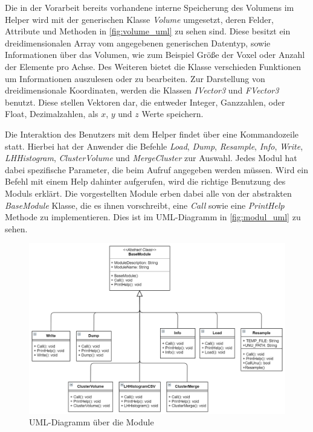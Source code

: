 Die in der Vorarbeit bereits vorhandene interne Speicherung des Volumens im Helper wird mit der generischen Klasse \textit{Volume} umgesetzt, deren Felder, Attribute und Methoden in \autoref{fig:volume_uml} zu sehen sind. Diese besitzt ein dreidimensionalen Array vom angegebenen generischen Datentyp, sowie Informationen über das Volumen, wie zum Beispiel Größe der Voxel oder Anzahl der Elemente pro Achse.
Des Weiteren bietet die Klasse verschieden Funktionen um Informationen auszulesen oder zu bearbeiten. Zur Darstellung von dreidimensionale Koordinaten, werden die Klassen \textit{IVector3} und \textit{FVector3} benutzt. Diese stellen Vektoren dar, die entweder Integer, Ganzzahlen, oder Float, Dezimalzahlen, als $x$, $y$ und $z$ Werte speichern.


Die Interaktion des Benutzers mit dem Helper findet über eine Kommandozeile statt. Hierbei hat der Anwender die Befehle \textit{Load}, \textit{Dump}, \textit{Resample}, \textit{Info}, \textit{Write}, \textit{LHHistogram}, \textit{ClusterVolume} und \textit{MergeCluster} zur Auswahl. Jedes Modul hat dabei spezifische Parameter, die beim Aufruf angegeben werden müssen. Wird ein Befehl mit einem Help dahinter aufgerufen, wird die richtige Benutzung des Moduls erklärt.
Die vorgestellten Module erben dabei alle von der abstrakten \textit{BaseModule} Klasse, die es ihnen vorschreibt, eine \textit{Call} sowie eine \textit{PrintHelp} Methode zu implementieren. Dies ist im UML-Diagramm in \autoref{fig:modul_uml} zu sehen.


\begin{figure}[h]
\centering 
\includegraphics[width=\textwidth]{Logos/Modules_UML.PNG}
\caption{UML-Diagramm über die Module} 
\label{fig:modul_uml} 
\end{figure}


